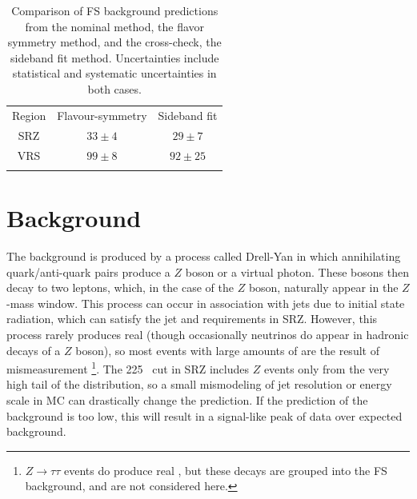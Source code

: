 \begin{table}[h]
\centering

\begin{tabular}{ccc}
\noalign{\smallskip}\hline\noalign{\smallskip}
Region  & Flavour-symmetry  & Sideband fit  \\
\noalign{\smallskip}\hline\hline\noalign{\smallskip}
SRZ & $33 \pm 4$   &  $29 \pm 7$  \\ [+0.05cm]
VRS & $99\pm8$        &  $92 \pm 25$  \\ [+0.05cm]
\noalign{\smallskip}\hline\hline
\end{tabular}
\caption{ Comparison of \ac{FS} background predictions from the nominal method, the flavor symmetry method, and the cross-check, the sideband fit method. Uncertainties include statistical and systematic uncertainties in both cases. }
\label{tab:fs_comparison}
\end{table}


\section{\dyjets Background}
\label{sec:bg-z}

The \dyjets background is produced by a process called Drell-Yan in which annihilating quark/anti-quark pairs produce a $Z$ boson or a virtual photon. These bosons then decay to two leptons, which, in the case of the $Z$ boson, naturally appear in the $Z$-mass window. This process can occur in association with jets due to initial state radiation, which can satisfy the jet and \HT requirements in SRZ. However, this process rarely produces real \met (though occasionally neutrinos do appear in hadronic decays of a $Z$ boson), so most events with large amounts of \met are the result of mismeasurement \footnote{$Z\rightarrow\tau\tau$ events do produce real \met, but these decays are grouped into the \ac{FS} background, and are not considered here.}. The 225 \gev~\met cut in SRZ includes $Z$ events only from the very high tail of the \met distribution, so a small mismodeling of jet resolution or energy scale in \ac{MC} can drastically change the prediction. If the prediction of the \dyjets background is too low, this will result in a signal-like peak of data over expected background. 

